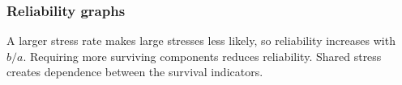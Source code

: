 \subsubsection{Reliability graphs}
A larger stress rate makes large stresses less likely, so reliability increases with $b/a$. Requiring more surviving components reduces reliability. Shared stress creates dependence between the survival indicators.
\FloatBarrier
